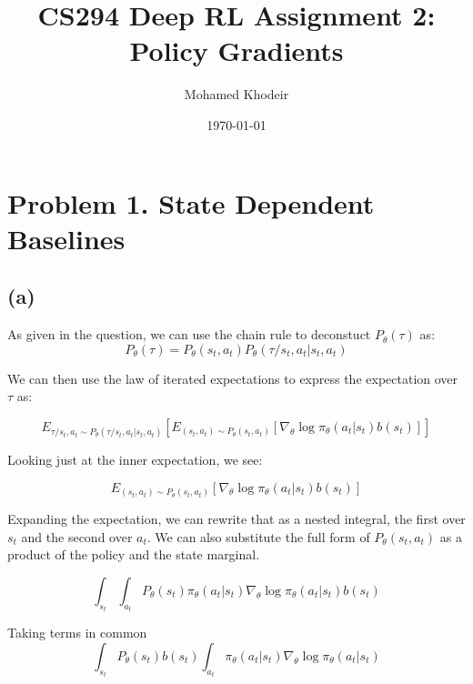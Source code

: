\documentclass[a4paper]{article}
\title{CS294 Deep RL Assignment 2: Policy Gradients}
\author{Mohamed Khodeir}
\date{\today}
\begin{document}
\maketitle


\section*{Problem 1. State Dependent Baselines}
\subsection*{(a)}

As given in the question, we can use the chain rule to deconstuct $P_\theta(\tau)$ as: 
$$P_\theta(\tau) = P_{\theta}(s_t, a_t) P_\theta(\tau/s_t,a_t | s_t, a_t)$$

We can then use the law of iterated expectations to express the expectation over $\tau$ as:

$$  E_{\tau/s_t,a_t \sim P_\theta(\tau/s_t,a_t | s_t, a_t)}[ E_{(s_t, a_t) \sim P_{\theta}(s_t, a_t)}[\nabla_\theta \log \pi_\theta (a_t|s_t) b(s_t)]] $$


Looking just at the inner expectation, we see:

$$  E_{(s_t, a_t) \sim P_{\theta}(s_t, a_t)}[ \nabla_\theta \log \pi_\theta (a_t|s_t) b(s_t)] $$




Expanding the expectation, we can rewrite that as a nested integral, the first over $s_t$ and the second over $a_t$. We can also substitute the full form of $P_{\theta}(s_t, a_t)$  as a product of the policy and the state marginal.

$$  \int_{s_t} \int_{a_t}  P_{\theta}(s_t)\pi_\theta(a_t | s_t) \nabla_\theta \log \pi_\theta (a_t|s_t) b(s_t) $$

Taking terms in common
$$  \int_{s_t}  P_{\theta}(s_t) b(s_t) \int_{a_t} \pi_\theta(a_t | s_t) \nabla_\theta \log \pi_\theta (a_t|s_t) $$
\end{document}
